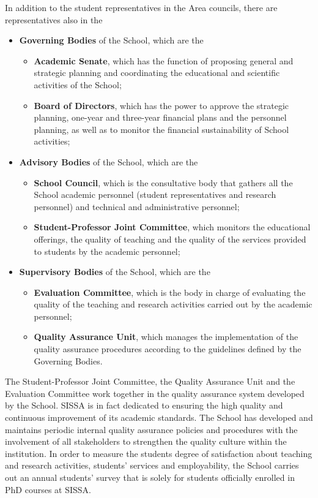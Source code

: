 \documentclass{sissavademecum}
\begin{document}
In addition to the student representatives in the Area councils, there are representatives also in the
\begin{itemize}
	\item \textbf{Governing Bodies} of the School, which are the
	\begin{itemize}
		\item \textbf{Academic Senate}, which has the function of proposing general and strategic planning and coordinating the educational and scientific activities of the School;
		\item \textbf{Board of Directors}, which has the power to approve the strategic planning, one-year and three-year financial plans and the personnel planning, as well as to monitor the financial sustainability of School activities;
	\end{itemize}
	\item \textbf{Advisory Bodies} of the School, which are the
	\begin{itemize}
		\item \textbf{School Council}, which is the consultative body that gathers all the School academic personnel (student representatives and research personnel) and technical and administrative personnel;
		\item \textbf{Student-Professor Joint Committee}, which monitors the educational offerings, the quality of teaching and the quality of the services provided to students by the academic personnel;
	\end{itemize}
	\item \textbf{Supervisory Bodies} of the School, which are the
	\begin{itemize}
		\item \textbf{Evaluation Committee}, which is the body in charge of evaluating the quality of the teaching and research activities carried out by the academic personnel;
		\item \textbf{Quality Assurance Unit}, which manages the implementation of the quality assurance procedures according to the guidelines defined by the Governing Bodies.
	\end{itemize}
\end{itemize}

The Student-Professor Joint Committee, the Quality Assurance Unit and the Evaluation Committee work together in the quality assurance system developed by the School. SISSA is in fact dedicated to ensuring the high quality and continuous improvement of its academic standards. The School has developed and maintains periodic internal quality assurance policies and procedures with the involvement of all stakeholders to strengthen the quality culture within the institution. In order to measure the students degree of satisfaction about teaching and research activities, students' services and employability, the School carries out an annual students' survey that is solely for students officially enrolled in PhD courses at SISSA.
\end{document}
